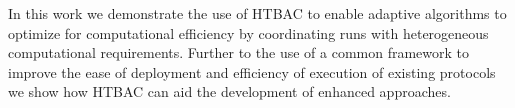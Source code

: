


In this work we demonstrate the use of HTBAC to enable adaptive  
algorithms to optimize for computational efficiency by coordinating runs with 
heterogeneous computational requirements.
Further to the use of a common framework to improve the ease of deployment and
efficiency of execution of existing protocols we show how HTBAC can aid the
development of enhanced approaches. 


